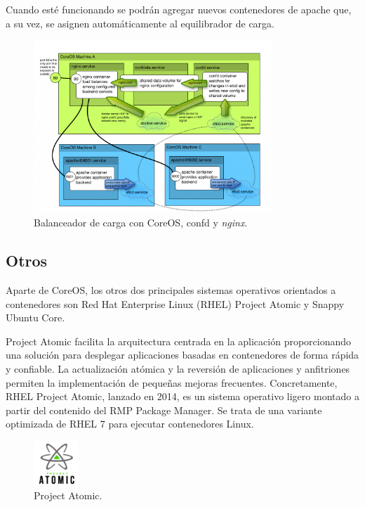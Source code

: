 Cuando esté funcionando se podrán agregar nuevos contenedores de apache que, a su vez, se asignen automáticamente al equilibrador de carga.

\begin{figure}[H]
\centering
\includegraphics[width=0.8\textwidth]{images/figures/loadbalancerconfd.png}
\caption{Balanceador de carga con CoreOS, confd y \textit{nginx}.\label{fig:figure_placement_example}}
\end{figure}

\subsection{Otros}

Aparte de CoreOS, los otros dos principales sistemas operativos orientados a contenedores son  Red Hat Enterprise Linux (RHEL) Project Atomic y Snappy Ubuntu Core.

Project Atomic facilita la arquitectura centrada en la aplicación proporcionando una solución para desplegar aplicaciones basadas en contenedores de forma rápida y confiable. La actualización atómica y la reversión de aplicaciones y anfitriones permiten la implementación de pequeñas mejoras frecuentes. Concretamente, RHEL Project Atomic, lanzado en 2014, es un sistema operativo ligero montado a partir del contenido del RMP Package Manager. Se trata de una variante optimizada de RHEL 7 para ejecutar contenedores Linux.

\begin{figure}[H]
\centering
\includegraphics[width=0.15\textwidth]{images/figures/projectatomic.png}
\caption{Project Atomic.\label{fig:figure_placement_example}}
\end{figure}

